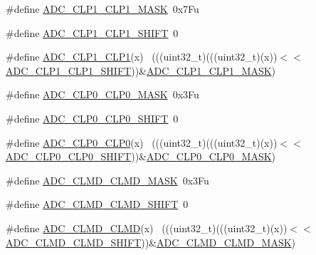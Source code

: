 \begin{DoxyCompactItemize}
\item 
\#define \hyperlink{group___a_d_c___register___masks_ga597fddbb6d859ea54a49dd4a1eea72fb}{A\+D\+C\+\_\+\+C\+L\+P1\+\_\+\+C\+L\+P1\+\_\+\+M\+A\+SK}~0x7\+Fu
\item 
\#define \hyperlink{group___a_d_c___register___masks_gab34e145666bb569d17f381665d6f5156}{A\+D\+C\+\_\+\+C\+L\+P1\+\_\+\+C\+L\+P1\+\_\+\+S\+H\+I\+FT}~0
\item 
\#define \hyperlink{group___a_d_c___register___masks_ga214e6735f8151ad43f51f86364386036}{A\+D\+C\+\_\+\+C\+L\+P1\+\_\+\+C\+L\+P1}(x)                                              ~(((uint32\+\_\+t)(((uint32\+\_\+t)(x))$<$$<$\hyperlink{group___a_d_c___register___masks_gab34e145666bb569d17f381665d6f5156}{A\+D\+C\+\_\+\+C\+L\+P1\+\_\+\+C\+L\+P1\+\_\+\+S\+H\+I\+FT}))\&\hyperlink{group___a_d_c___register___masks_ga597fddbb6d859ea54a49dd4a1eea72fb}{A\+D\+C\+\_\+\+C\+L\+P1\+\_\+\+C\+L\+P1\+\_\+\+M\+A\+SK})
\item 
\#define \hyperlink{group___a_d_c___register___masks_ga7a8099e7e4fcb450308767ab0df8e458}{A\+D\+C\+\_\+\+C\+L\+P0\+\_\+\+C\+L\+P0\+\_\+\+M\+A\+SK}~0x3\+Fu
\item 
\#define \hyperlink{group___a_d_c___register___masks_gad3035c445e10948c653ac0a028008109}{A\+D\+C\+\_\+\+C\+L\+P0\+\_\+\+C\+L\+P0\+\_\+\+S\+H\+I\+FT}~0
\item 
\#define \hyperlink{group___a_d_c___register___masks_ga4474d62a7ce00adb7467954027539676}{A\+D\+C\+\_\+\+C\+L\+P0\+\_\+\+C\+L\+P0}(x)                                              ~(((uint32\+\_\+t)(((uint32\+\_\+t)(x))$<$$<$\hyperlink{group___a_d_c___register___masks_gad3035c445e10948c653ac0a028008109}{A\+D\+C\+\_\+\+C\+L\+P0\+\_\+\+C\+L\+P0\+\_\+\+S\+H\+I\+FT}))\&\hyperlink{group___a_d_c___register___masks_ga7a8099e7e4fcb450308767ab0df8e458}{A\+D\+C\+\_\+\+C\+L\+P0\+\_\+\+C\+L\+P0\+\_\+\+M\+A\+SK})
\item 
\#define \hyperlink{group___a_d_c___register___masks_ga45c4117ad9fba213c3d338cf6280cb75}{A\+D\+C\+\_\+\+C\+L\+M\+D\+\_\+\+C\+L\+M\+D\+\_\+\+M\+A\+SK}~0x3\+Fu
\item 
\#define \hyperlink{group___a_d_c___register___masks_ga872bf108b50c6dd439ddc1294f104fe5}{A\+D\+C\+\_\+\+C\+L\+M\+D\+\_\+\+C\+L\+M\+D\+\_\+\+S\+H\+I\+FT}~0
\item 
\#define \hyperlink{group___a_d_c___register___masks_gada01491a34a2a912a7cdbccac2134da4}{A\+D\+C\+\_\+\+C\+L\+M\+D\+\_\+\+C\+L\+MD}(x)                                              ~(((uint32\+\_\+t)(((uint32\+\_\+t)(x))$<$$<$\hyperlink{group___a_d_c___register___masks_ga872bf108b50c6dd439ddc1294f104fe5}{A\+D\+C\+\_\+\+C\+L\+M\+D\+\_\+\+C\+L\+M\+D\+\_\+\+S\+H\+I\+FT}))\&\hyperlink{group___a_d_c___register___masks_ga45c4117ad9fba213c3d338cf6280cb75}{A\+D\+C\+\_\+\+C\+L\+M\+D\+\_\+\+C\+L\+M\+D\+\_\+\+M\+A\+SK})
$$
\end{DoxyCompactItemize}
